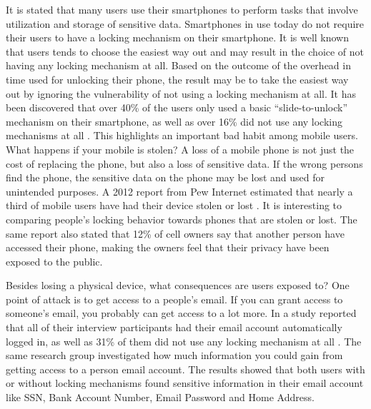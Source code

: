   It is stated that many users use their smartphones to perform tasks that involve utilization and storage of sensitive data. Smartphones in use today do not require their users to have a locking mechanism on their smartphone. It is well known that users tends to choose the easiest way out and may result in the choice of not having any locking mechanism at all. Based on the outcome of the overhead in time used for unlocking their phone, the result may be to take the easiest way out by ignoring the vulnerability of not using a locking mechanism at all. It has been discovered that over 40\% of the users only used a basic ``slide-to-unlock'' mechanism on their smartphone, as well as over 16\% did not use any locking mechanisms at all \cite{habits3}. This highlights an important bad habit among mobile users. What happens if your mobile is stolen? A loss of a mobile phone is not just the cost of replacing the phone, but also a loss of sensitive data. If the wrong persons find the phone, the sensitive data on the phone may be lost and used for unintended purposes. A 2012 report from Pew Internet estimated that nearly a third of mobile users have had their device stolen or lost \cite{StolenLost}. It is interesting to comparing people's locking behavior towards phones that are stolen or lost. The same report also stated that 12\% of cell owners say that another person have accessed their phone, making the owners feel that their privacy have been exposed to the public.

  Besides losing a physical device, what consequences are users exposed to? One point of attack is to get access to a people's email. If you can grant access to someone's email, you probably can get access to a lot more. In a study reported that all of their interview participants had their email account automatically logged in, as well as 31\% of them did not use any locking mechanism at all \cite{Egelman}. The same research group investigated how much information you could gain from getting access to a person email account. The results showed that both users with or without locking mechanisms found sensitive information in their email account like SSN, Bank Account Number, Email Password and Home Address.

